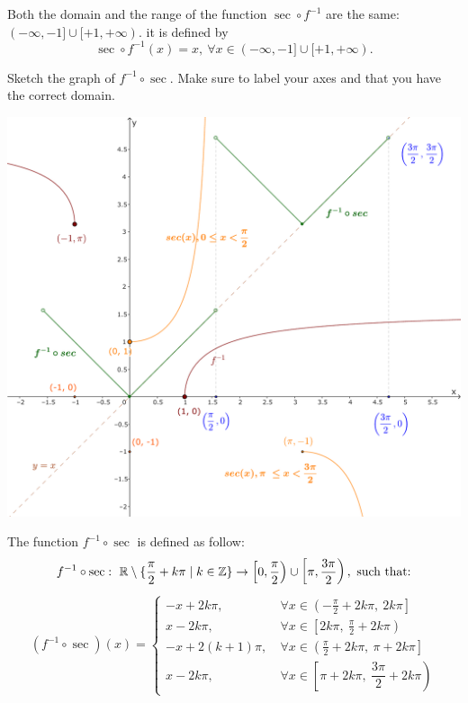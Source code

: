 \documentclass{article}
\begin{document}
\begin{soln}
    Both the domain and the range of the function $\sec \circ f^{-1}$ are the same: $(-\infty, -1] \cup [+1, +\infty).$
    it is defined by
    \[
        \sec \circ f^{-1}(x) = x,\ \forall x \in (-\infty, -1] \cup [+1, +\infty).
    \]
\end{soln}

\newpage

\begin{problem*}[1d]
    Sketch the graph of $f^{-1} \circ \sec.$ Make sure to label your axes and that you have the correct domain.
\end{problem*}

\begin{center}
    \includegraphics[width=14cm]{./svg/pdf/derivative-2-1d-f.pdf}
\end{center}

\begin{soln}
    The function $f^{-1} \circ \sec$ is defined as follow:
    \[
        f^{-1} \circ \sec:\ \RR \setminus \{ \frac{\pi}{2} + k \pi \mid k \in \ZZ \} \rightarrow \left[0, \frac{\pi}{2} \right) \cup \left[\pi, \frac{3\pi}{2} \right), \text{\ such that:}
    \]
    \[
        (f^{-1} \circ \sec)(x) = 
        \left\{
            \begin{aligned}
                -x + 2k\pi, &\ \forall x \in \left( -\frac{\pi}{2} + 2k\pi,\ 2k\pi \right]\\
                x - 2k\pi, &\ \forall x \in \left[ 2k\pi,\ \frac{\pi}{2} + 2k\pi \right)\\
                -x + 2(k+1)\pi, &\ \forall x \in \left( \frac{\pi}{2} + 2k\pi,\ \pi + 2k\pi \right]\\
                x - 2k\pi, &\ \forall x \in \left[ \pi + 2k\pi,\ \dfrac{3\pi}{2} + 2k\pi \right)
            \end{aligned}
        \right.
    \]
\end{soln}
\end{document}
